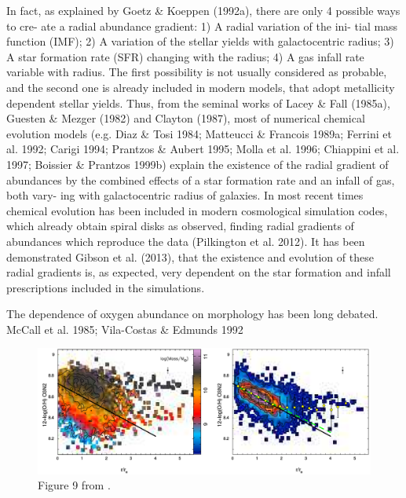 \documentclass[11pt, a4paper, onecolumn]{article}
\begin{document}
\begin{multicols}{2}
    \citet{sanchez12} In fact, as explained by Goetz \& Koeppen (1992a), there
    are only 4 possible ways to cre- ate a radial abundance gradient: 1) A
    radial variation of the ini- tial mass function (IMF); 2) A variation of
    the stellar yields with galactocentric radius; 3) A star formation rate
    (SFR) changing with the radius; 4) A gas infall rate variable with radius.
    The first possibility is not usually considered as probable, and the second
    one is already included in modern models, that adopt metallicity dependent
    stellar yields. Thus, from the seminal works of Lacey \& Fall (1985a),
    Guesten \& Mezger (1982) and Clayton (1987), most of numerical chemical
    evolution models (e.g.  Diaz \& Tosi 1984; Matteucci \& Francois 1989a;
    Ferrini et al.  1992; Carigi 1994; Prantzos \& Aubert 1995; Molla et al.
    1996; Chiappini et al. 1997; Boissier \& Prantzos 1999b) explain the
    existence of the radial gradient of abundances by the combined effects of a
    star formation rate and an infall of gas, both vary- ing with
    galactocentric radius of galaxies. In most recent times chemical evolution
    has been included in modern cosmological simulation codes, which already
    obtain spiral disks as observed, finding radial gradients of abundances
    which reproduce the data (Pilkington et al. 2012). It has been demonstrated
    Gibson et al.  (2013), that the existence and evolution of these radial
    gradients is, as expected, very dependent on the star formation and infall
    prescriptions included in the simulations.


    The dependence of oxygen abundance on morphology has been long debated.
    McCall et al. 1985; Vila-Costas \& Edmunds 1992



\end{multicols}
\begin{figure}[!ht]

    \includegraphics[scale=0.45]{figures/sanchez12_fig9.pdf}

    \caption{Figure 9 from \citet{sanchez12}.\/}

\end{figure}
\end{document}
